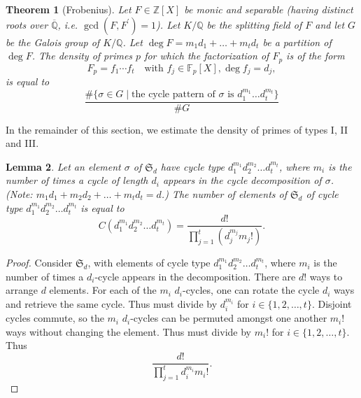 \documentclass[11pt]{article}
\theoremstyle{plain}
\newtheorem{theorem}{Theorem}[section]
\newtheorem{lemma}[theorem]{Lemma}
\theoremstyle{definition}
\theoremstyle{remark}
\numberwithin{equation}{section}
\numberwithin{table}{section}
\newcommand{\ZZ}{\mathbb{Z}}
\newcommand{\FF}{\mathbb{F}}
\newcommand{\QQ}{\mathbb{Q}}
\renewcommand{\SS}{\mathfrak{S}}
\begin{document}
\begin{theorem}[Frobenius]\label{thm:frobenius}
  Let $F\in\ZZ[X]$ be monic and separable (having distinct roots over
  $\overline{\QQ}$, i.e. $\gcd(F, F^\prime)=1$).  Let $K/\QQ$ be the splitting
  field of $F$ and let $G$ be the Galois group of $K/\QQ$.  
  Let $\deg F=m_1d_1+\ldots+m_td_t$ be a partition of $\deg F$.  
  The density of primes $p$ for which the factorization of $F_p$ is of the
  form
  \begin{equation*}
    F_p=f_1\cdots f_t\quad\text{with }f_j\in\FF_p[X], \deg f_j=d_j,
  \end{equation*}
  is equal to
  \begin{equation*}
    \frac{\#\{\sigma\in G\mid\text{the cycle pattern of $\sigma$ is 
    $d_1^{m_1}\ldots d_t^{m_t}$}\}
    }{\# G}
  \end{equation*}
\end{theorem}

In the remainder of this section, we estimate the density of primes of types
I, II and III.

\begin{lemma}\label{lem:cycletype}
  Let an element $\sigma$ of $\SS_d$ have cycle type $d_1^{m_1}d_2^{m_2}\ldots d_t^{m_t}$, 
  where $m_i$ is the number of times a cycle of length $d_i$ appears in the cycle
  decomposition of $\sigma$. (Note: $m_1d_1+m_2d_2+\ldots +m_td_t=d$.) The number
   of elements of $\SS_d$ of cycle type $d_1^{m_1}d_2^{m_2}\ldots d_t^{m_t}$ is equal to
  \begin{equation*}
    C(d_1^{m_1}d_2^{m_2}\ldots d_t^{m_t})=\frac{d!}{\prod_{j=1}^t\left(d_j^{m_j}m_j!\right)}.
  \end{equation*}


\end{lemma}
\begin{proof}
  Consider $\SS_d$, with elements of cycle type $d_1^{m_1} d_2^{m_2} \ldots d_t^{m_t}$, 
  where $m_i$ is the number of times a $d_i$-cycle appears in the decomposition.
  There are $d!$ ways to arrange $d$ elements.
  For each of the $m_i$ $d_i$-cycles, one can rotate the cycle $d_i$ ways and retrieve the 
  same cycle. Thus must divide by $d_i^{m_i}$ for $i \in \{1,2,\ldots,t\}$.
  Disjoint cycles commute, so the $m_i$ $d_i$-cycles can be permuted amongst one another 
  $m_i!$ ways without changing the element. Thus must divide by $m_i!$ for $i \in \{1,2,\ldots,t\}$.
  Thus
  \begin{equation*}
    \frac{d!}{\prod_{j=1}^t d_i^{m_i} m_i!}.
  \end{equation*}
\end{proof}
\end{document}
